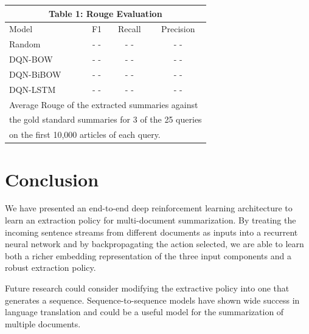 \documentclass[12pt]{article}
\begin{document}
\begin{center}
\begin{tabular}{  l | c | c | c  }
	\multicolumn{4}{c}{\textbf{Table 1}: Rouge Evaluation} \\
	\hline
	Model  & F1 & Recall & Precision  \\ \hline \hline
	Random  & \color{ red} - - & \color{ red} - -  & \color{ red} - -\\ 
	DQN-BOW  & \color{ red} - - & \color{ red} - -  & \color{ red} - -\\
	DQN-BiBOW  & \color{ red} - - & \color{ red} - -  & \color{ red} - -\\
	DQN-LSTM  & \color{ red}  - - & \color{ red} - -  & \color{ red} - -\\ \hline
	\hline
	\multicolumn{4}{l}{\footnotesize Average Rouge of the extracted summaries against} \\
	\multicolumn{4}{l}{\footnotesize the gold standard summaries for 3 of the 25 queries} \\
	\multicolumn{4}{l}{\footnotesize  on the first 10,000 articles of each query.} \\
	\hline
\end{tabular}
\end{center}

\section{Conclusion}
We have presented an end-to-end deep reinforcement learning architecture to learn an extraction policy for multi-document summarization. By treating the incoming sentence streams from different documents as inputs into a recurrent neural network and by backpropagating the action selected, we are able to learn both a richer embedding representation of the three input components and a robust extraction policy. 

Future research could consider modifying the extractive policy into one that generates a sequence. Sequence-to-sequence models \cite{sutskever2014sequence} have shown wide success in language translation and could be a useful model for the summarization of multiple documents.


\end{document}

